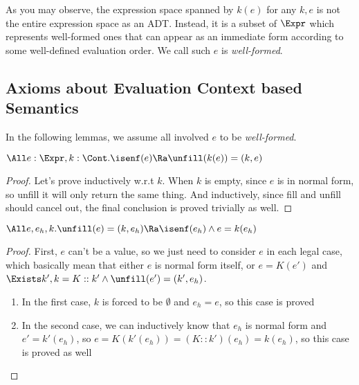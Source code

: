 As you may observe, the expression space spanned by $k(e)$ for any $k, e$ is not the entire
expression space as an ADT. Instead, it is a subset of $\Expr$ which represents well-formed ones
that can appear as an immediate form according to some well-defined evaluation order. We call
such $e$ is \emph{well-formed}.

\subsection{Axioms about Evaluation Context based Semantics}

In the following lemmas, we assume all involved $e$ to be \emph{well-formed}.

\begin{lemma}
$\All e: \Expr, k: \Cont . \isenf(e) \Ra \unfill(k(e)) = (k, e)$
\end{lemma}
\begin{proof}

Let's prove inductively w.r.t $k$. When $k$ is empty,
since $e$ is in normal form, so unfill it will only return the same thing.
And inductively, since fill and unfill should cancel out, the final conclusion is proved trivially as well.

\end{proof}

\begin{lemma}
  $\All e, e_h, k. \unfill(e) = (k, e_h) \Ra \isenf(e_h) \land e = k(e_h)$
\end{lemma}
\begin{proof}
    First, $e$ can't be a value, so we just need to consider $e$ in each legal case, which basically
    mean that either $e$ is normal form itself, or $e = K(e')$ and $\Exists k', k = K::k' \land \unfill(e') = (k', e_h)$.
    \begin{enumerate}
        \item In the first case, $k$ is forced to be $\emptyset$ and $e_h = e$, so this case is proved
        \item In the second case, we can inductively know that $e_h$ is normal form and $e' = k'(e_h)$,
              so $e = K(k'(e_h)) = (K::k')(e_h) = k(e_h)$, so this case is proved as well
    \end{enumerate}
\end{proof}


